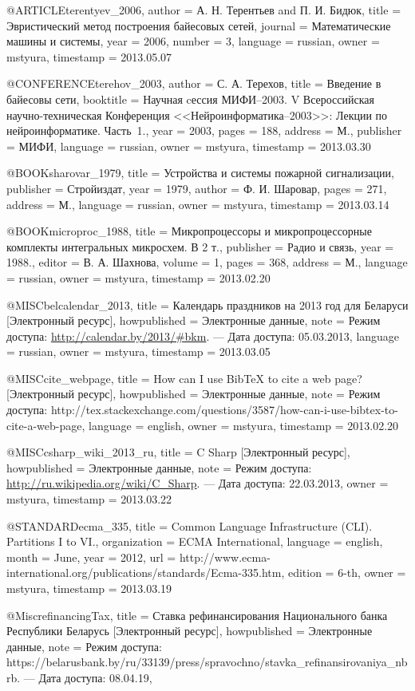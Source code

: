 @ARTICLE{terentyev_2006,
  author = {А. Н. Терентьев and П. И. Бидюк},
  title = {Эвристический метод построения байесовых сетей},
  journal = {Математические машины и системы},
  year = {2006},
  number = {3},
  language = {russian},
  owner = {mstyura},
  timestamp = {2013.05.07}
}

@CONFERENCE{terehov_2003,
  author = {С. А. Терехов},
  title = {Введение в байесовы сети},
  booktitle = {Научная cессия МИФИ--2003. V Всероссийская научно-техническая Конференция
	<<Нейроинформатика--2003>>: Лекции по нейроинформатике. Часть~1.},
  year = {2003},
  pages = {188},
  address = {М.},
  publisher = {МИФИ},
  language = {russian},
  owner = {mstyura},
  timestamp = {2013.03.30}
}

@BOOK{sharovar_1979,
  title = {Устройства и системы пожарной сигнализации},
  publisher = {Стройиздат},
  year = {1979},
  author = {Ф. И. Шаровар},
  pages = {271},
  address = {М.},
  language = {russian},
  owner = {mstyura},
  timestamp = {2013.03.14}
}

@BOOK{microproc_1988,
  title = {Микропроцессоры и микропроцессорные комплекты интегральных микросхем.
	В 2 т.},
  publisher = {Радио и связь},
  year = {1988.},
  editor = {В. А. Шахнова},
  volume = {1},
  pages = {368},
  address = {М.},
  language = {russian},
  owner = {mstyura},
  timestamp = {2013.02.20}
}

@MISC{belcalendar_2013,
  title = {Календарь праздников на 2013 год для Беларуси [Электронный ресурс]},
  howpublished = {Электронные данные},
  note = {Режим доступа: \url{http://calendar.by/2013/\#bkm}. --- Дата доступа:
	05.03.2013},
  language = {russian},
  owner = {mstyura},
  timestamp = {2013.03.05}
}

@MISC{cite_webpage,
  title = {How can I use BibTeX to cite a web page? [Электронный ресурс]},
  howpublished = {Электронные данные},
  note = {Режим доступа: http://tex.stackexchange.com/questions/3587/how-can-i-use-bibtex-to-cite-a-web-page},
  language = {english},
  owner = {mstyura},
  timestamp = {2013.02.20}
}

@MISC{csharp_wiki_2013_ru,
  title = {C Sharp [Электронный ресурс]},
  howpublished = {Электронные данные},
  note = {Режим доступа: \url{http://ru.wikipedia.org/wiki/C\_Sharp}. --- Дата
	доступа: 22.03.2013},
  owner = {mstyura},
  timestamp = {2013.03.22}
}

@STANDARD{ecma_335,
  title = {Common Language Infrastructure (CLI). Partitions I to VI.},
  organization = {ECMA International},
  language = {english},
  month = {June},
  year = {2012},
  url = {http://www.ecma-international.org/publications/standards/Ecma-335.htm},
  edition = {6-th},
  owner = {mstyura},
  timestamp = {2013.03.19}
}

@Misc{refinancingTax,
  title        = {Ставка рефинансирования Национального банка Республики Беларусь [Электронный ресурс]},
  howpublished = {Электронные данные},
  note         = {Режим доступа: https://belarusbank.by/ru/33139/press/spravochno/stavka_refinansirovaniya_nbrb. --- Дата доступа: 08.04.19},
}

